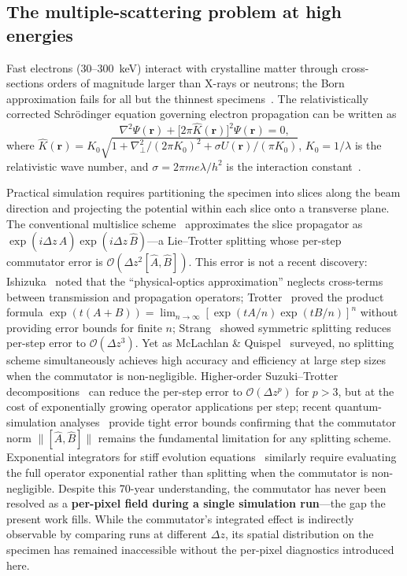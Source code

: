\documentclass[twoside,11pt]{article}
\begin{document}
\subsection{The multiple-scattering problem at high energies}

Fast electrons (30--300~keV) interact with crystalline matter through cross-sections orders of magnitude larger than X-rays or neutrons; the Born approximation fails for all but the thinnest specimens~\cite{Kirkland2020,CowleyMoodie1957}. The relativistically corrected Schr\"odinger equation governing electron propagation can be written as
\begin{equation}\label{eq:helmholtz}
\nabla^2\Psi(\mathbf{r})+\big[2\pi\hat{K}(\mathbf{r})\big]^2\Psi(\mathbf{r})=0,
\end{equation}
where $\hat{K}(\mathbf{r})=K_0\sqrt{1+\nabla_\perp^2/(2\pi K_0)^2+\sigma U(\mathbf{r})/(\pi K_0)}$, $K_0=1/\lambda$ is the relativistic wave number, and $\sigma=2\pi m e\lambda/h^2$ is the interaction constant~\cite{ChenVanDyck1997}.

Practical simulation requires partitioning the specimen into slices along the beam direction and projecting the potential within each slice onto a transverse plane. The conventional multislice scheme~\cite{Kirkland2020,CowleyMoodie1957} approximates the slice propagator as $\exp(i\Delta z\,\hat A)\exp(i\Delta z\,\hat B)$---a Lie--Trotter splitting whose per-step commutator error is $\mathcal O(\Delta z^2[\hat A,\hat B])$. This error is not a recent discovery: Ishizuka~\cite{IshizukaUyeda1977} noted that the ``physical-optics approximation'' neglects cross-terms between transmission and propagation operators; Trotter~\cite{Trotter1959} proved the product formula $\exp(t(A+B))=\lim_{n\to\infty}[\exp(tA/n)\exp(tB/n)]^n$ without providing error bounds for finite $n$; Strang~\cite{Strang1968} showed symmetric splitting reduces per-step error to $\mathcal O(\Delta z^3)$. Yet as McLachlan \& Quispel~\cite{McLachlanQuispel2002} surveyed, no splitting scheme simultaneously achieves high accuracy and efficiency at large step sizes when the commutator is non-negligible. Higher-order Suzuki--Trotter decompositions~\cite{Suzuki1990} can reduce the per-step error to $\mathcal O(\Delta z^p)$ for $p>3$, but at the cost of exponentially growing operator applications per step; recent quantum-simulation analyses~\cite{Childs2021} provide tight error bounds confirming that the commutator norm $\|[\hat A,\hat B]\|$ remains the fundamental limitation for any splitting scheme. Exponential integrators for stiff evolution equations~\cite{HochbruckOstermann2010} similarly require evaluating the full operator exponential rather than splitting when the commutator is non-negligible. Despite this 70-year understanding, the commutator has never been resolved as a \textbf{per-pixel field during a single simulation run}---the gap the present work fills. While the commutator's integrated effect is indirectly observable by comparing runs at different $\Delta z$, its spatial distribution on the specimen has remained inaccessible without the per-pixel diagnostics introduced here.
\end{document}
